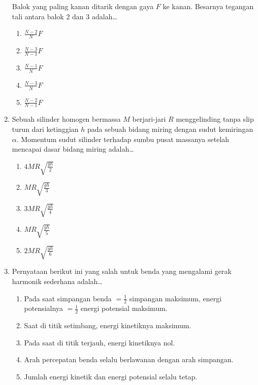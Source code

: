\documentclass[A4,12PT, english, twocolumn]{journal}
\begin{document}
\begin{enumerate}
\begin{center}
\end{center}
Balok yang paling kanan ditarik dengan gaya $F$ ke kanan. Besarnya tegangan tali antara balok $2$ dan $3$ adalah\dots
    \begin{enumerate}
        \item $\frac{N-2}{N}F$
        \item $\frac{N-3}{N-1}F$
        \item $\frac{N-1}{N}F$
        \item $\frac{N-3}{N}F$
        \item $\frac{N-2}{N-1}F$
    \end{enumerate}
    
\item Sebuah silinder homogen bermassa $M$ berjari-jari $R$ menggelinding tanpa slip turun dari ketinggian $h$ pada sebuah bidang miring dengan sudut kemiringan $\alpha$. Momentum sudut silinder terhadap sumbu pusat massanya setelah mencapai dasar bidang miring adalah\dots
    \begin{enumerate}
        \item $4MR \sqrt{\frac{gh}{2}}$
        \item $MR \sqrt{\frac{gh}{3}}$
        \item $3MR \sqrt{\frac{gh}{4}}$
        \item $MR \sqrt{\frac{gh}{5}}$
        \item $2MR \sqrt{\frac{gh}{6}}$
    \end{enumerate}
    
\item Pernyataan berikut ini yang salah untuk benda yang mengalami gerak harmonik sederhana adalah\dots
	\begin{enumerate}
		\item Pada saat simpangan benda $= \frac{1}{2}$ simpangan maksimum, energi potensialnya $= \frac{1}{2}$ energi potensial maksimum.
		\item Saat di titik setimbang, energi kinetiknya maksimum.
		\item Pada saat di titik terjauh, energi kinetiknya nol.
		\item Arah percepatan benda selalu berlawanan dengan arah simpangan.
		\item Jumlah energi kinetik dan energi potensial selalu tetap.
	\end{enumerate}
	

\end{enumerate}
\end{document}
